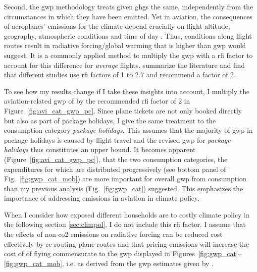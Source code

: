 \documentclass[a4paper,11pt,abstract=true]{scrartcl}
\begin{document}
Second, the \ac{gwp} methodology treats given \acp{ghg} the same, independently from the circumstances in which they have been emitted.
Yet in aviation, the consequences of aeroplanes' emissions for the climate depend crucially on flight altitude, geography, atmospheric conditions and time of day \citep{fromming_influence_2021}.
Thus, conditions along flight routes result in radiative forcing/global warming that is higher than \ac{gwp} would suggest.
It is a commonly applied method to multiply the \ac{gwp} with a \ac{rfi} factor to account
 for this difference for \emph{average} flights.
\citet{jungbluth_recommendations_2019} summarize the literature and find that different studies use \ac{rfi} factors of 1 to 2.7 and recommend a factor of 2.

To see how my results change if I take these insights into account, I multiply the aviation-related \ac{gwp} of \citet{jakobs_nfp73_2023} by the recommended \ac{rfi} factor of 2 in Figure~\ref{fig:avi_cat_gwp_pc}.
Since plane tickets are not only booked directly but also as part of package holidays, I give the same treatment to the consumption category \emph{package holidays}.
This assumes that the majority of \ac{gwp} in package holidays is caused by flight travel and the revised \ac{gwp} for \emph{package holidays} thus constitutes an upper bound.
It becomes apparent (Figure~\ref{fig:avi_cat_gwp_pc}), that the two consumption categories, the expenditures for which are distributed progressively (see bottom panel of Fig.~\ref{fig:gwp_cat_mob}) are more important for overall \ac{gwp} from consumption than my previous analysis (Fig.~\ref{fig:gwp_cat}) suggested.
This emphasizes the importance of addressing emissions in aviation in climate policy.

When I consider how exposed different households are to costly climate policy in the following section \ref{sec:climpol}, I do not include this \ac{rfi} factor.
I assume that the effects of non-\ac{co2} emissions on radiative forcing can be reduced cost effectively by re-routing plane routes and that pricing emissions will increase the cost of of flying commensurate to the \ac{gwp} displayed in Figures~\ref{fig:gwp_cat}--\ref{fig:gwp_cat_mob}, i.e. as derived from the \ac{gwp} estimates given by \citet{jakobs_nfp73_2023}.

\end{document}
